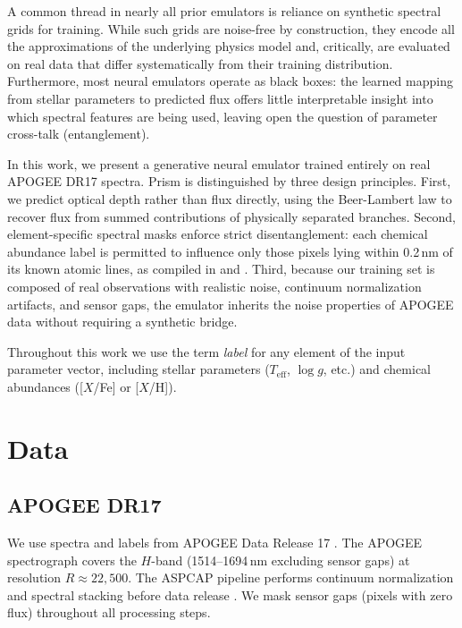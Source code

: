\documentclass[preprint]{aastex701-1/aastex701}
\begin{document}
A common thread in nearly all prior emulators is reliance on synthetic spectral grids
for training. While such grids are noise-free by construction, they encode all the
approximations of the underlying physics model and, critically, are evaluated on real data
that differ systematically from their training distribution. Furthermore, most neural emulators
operate as black boxes: the learned mapping from stellar parameters to predicted flux offers
little interpretable insight into which spectral features are being used, leaving open the
question of parameter cross-talk (entanglement).

In this work, we present a generative neural emulator trained entirely on real APOGEE DR17
spectra. Prism is distinguished by three design principles. First, we predict optical
depth rather than flux directly, using the Beer-Lambert law to recover flux from summed
contributions of physically separated branches. Second, element-specific spectral masks
enforce strict disentanglement: each chemical abundance label is permitted to influence only
those pixels lying within 0.2\,nm of its known atomic lines, as compiled in
\citet{Shetrone2015} and \citet{Smith2021DR17}. Third, because our training set is composed
of real observations with realistic noise, continuum normalization artifacts, and sensor gaps,
the emulator inherits the noise properties of APOGEE data without requiring a synthetic
bridge.

Throughout this work we use the term \emph{label} for any element of the input
parameter vector, including stellar parameters ($T_\mathrm{eff}$, $\log g$, etc.) and
chemical abundances ([$X$/Fe] or [$X$/H]).

\section{Data}
\label{sec:data}

\subsection{APOGEE DR17}
\label{subsec:data_apogee}

We use spectra and labels from APOGEE Data Release 17 \citep{Abdurrouf2022}. The APOGEE
spectrograph covers the $H$-band (1514--1694\,nm excluding sensor gaps) at resolution $R \approx 22{,}500$.
The ASPCAP pipeline performs continuum normalization and spectral stacking before
data release \citep{GarciaperezASPCAP2016}. We mask sensor gaps (pixels with zero flux) throughout all processing steps.
\end{document}

